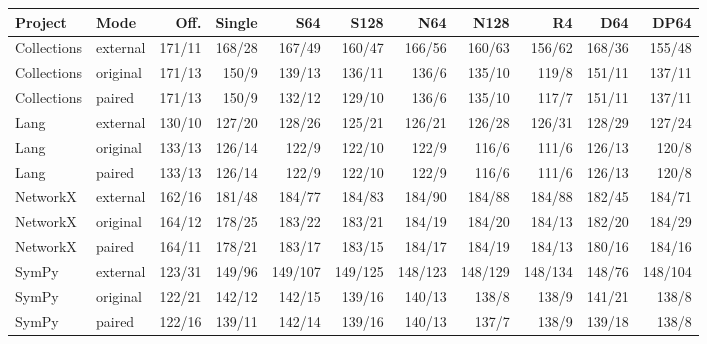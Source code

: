 \begin{tabular}{llrrrrrrrrr}
\toprule
Project & Mode & Off. & Single & S64 & S128 & N64 & N128 & R4 & D64 & DP64 \\
\midrule
Collections & external & 171/11 & 168/28 & 167/49 & 160/47 & 166/56 & 160/63 & 156/62 & 168/36 & 155/48 \\
Collections & original & 171/13 & 150/9 & 139/13 & 136/11 & 136/6 & 135/10 & 119/8 & 151/11 & 137/11 \\
Collections & paired & 171/13 & 150/9 & 132/12 & 129/10 & 136/6 & 135/10 & 117/7 & 151/11 & 137/11 \\
Lang & external & 130/10 & 127/20 & 128/26 & 125/21 & 126/21 & 126/28 & 126/31 & 128/29 & 127/24 \\
Lang & original & 133/13 & 126/14 & 122/9 & 122/10 & 122/9 & 116/6 & 111/6 & 126/13 & 120/8 \\
Lang & paired & 133/13 & 126/14 & 122/9 & 122/10 & 122/9 & 116/6 & 111/6 & 126/13 & 120/8 \\
NetworkX & external & 162/16 & 181/48 & 184/77 & 184/83 & 184/90 & 184/88 & 184/88 & 182/45 & 184/71 \\
NetworkX & original & 164/12 & 178/25 & 183/22 & 183/21 & 184/19 & 184/20 & 184/13 & 182/20 & 184/29 \\
NetworkX & paired & 164/11 & 178/21 & 183/17 & 183/15 & 184/17 & 184/19 & 184/13 & 180/16 & 184/16 \\
SymPy & external & 123/31 & 149/96 & 149/107 & 149/125 & 148/123 & 148/129 & 148/134 & 148/76 & 148/104 \\
SymPy & original & 122/21 & 142/12 & 142/15 & 139/16 & 140/13 & 138/8 & 138/9 & 141/21 & 138/8 \\
SymPy & paired & 122/16 & 139/11 & 142/14 & 139/16 & 140/13 & 137/7 & 138/9 & 139/18 & 138/8 \\
\bottomrule
\end{tabular}

